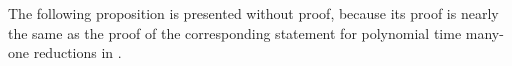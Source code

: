 \documentclass[draft]{article}
\newtheorem{corollary}[corollary]{Corollary}
\theoremstyle{definition} \newtheorem{openproblem}[openproblem]{Open problem}
\theoremstyle{definition} \newtheorem{definition}[definition]{Definition}
\theoremstyle{remark} \newtheorem{remark}{Remark}
\newcommand{\sigmastar}{\{0, 1\}^{*}} %
\newcommand{\kr}{\leq^{P}_{ker}} %
\newcommand{\pair}[2]{\langle#1,#2\rangle} %
\begin{document}




The following proposition is presented without proof, because its proof is nearly the same as the proof of the corresponding statement for polynomial time many-one reductions in \NP.
\end{document}
